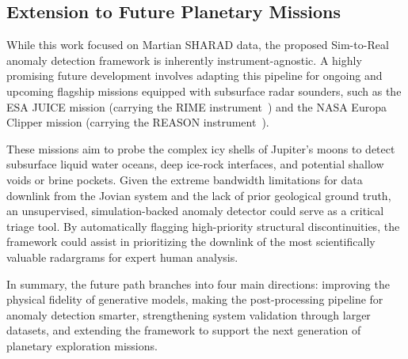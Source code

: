 \subsection{Extension to Future Planetary Missions}
While this work focused on Martian SHARAD data, the proposed Sim-to-Real anomaly detection framework is inherently instrument-agnostic.
A highly promising future development involves adapting this pipeline for ongoing and upcoming flagship missions equipped with subsurface radar sounders, such as the ESA JUICE mission (carrying the RIME instrument~\cite{Bruzzone2013RIME}) and the NASA Europa Clipper mission (carrying the REASON instrument~\cite{Blankenship2024REASON}). 

These missions aim to probe the complex icy shells of Jupiter's moons to detect subsurface liquid water oceans, deep ice-rock interfaces, and potential shallow voids or brine pockets.
Given the extreme bandwidth limitations for data downlink from the Jovian system and the lack of prior geological ground truth, an unsupervised, simulation-backed anomaly detector could serve as a critical triage tool.
By automatically flagging high-priority structural discontinuities, the framework could assist in prioritizing the downlink of the most scientifically valuable radargrams for expert human analysis.

In summary, the future path branches into four main directions: improving the physical fidelity of generative models, making the post-processing pipeline for anomaly detection smarter, strengthening system validation through larger datasets, and extending the framework to support the next generation of planetary exploration missions.


